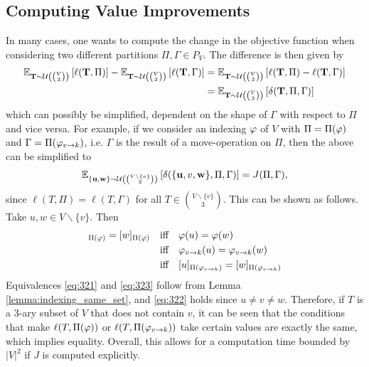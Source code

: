 \subsection{Computing Value Improvements}
In many cases, one wants to compute the change in the objective function when considering two different partitions $\Pi,\Gamma \in P_V$. The difference is then given by
\begin{align*}
    \mathbb{E}_{{\bf T} \sim \mathcal{U}\left(\binom{V}{3}\right)} \left[\ell({\bf T}, \Pi)\right] - \mathbb{E}_{{\bf T} \sim \mathcal{U}\left(\binom{V}{3}\right)} \left[\ell({\bf T}, \Gamma)\right] &= \mathbb{E}_{{\bf T} \sim \mathcal{U}\left(\binom{V}{3}\right)} \left[\ell({\bf T}, \Pi) - \ell({\bf T}, \Gamma)\right] \\
    &= \mathbb{E}_{{\bf T} \sim \mathcal{U}\left(\binom{V}{3}\right)} \left[\delta({\bf T}, \Pi, \Gamma)\right]
\end{align*}
which can possibly be simplified, dependent on the shape of $\Gamma$ with respect to $\Pi$ and vice versa. For example, if we consider an indexing $\varphi$ of $V$ with $\Pi = \Pi(\varphi)$ and $\Gamma = \Pi(\varphi_{v\rightarrow k})$, i.e. $\Gamma$ is the result of a move-operation on $\Pi$, then the above can be simplified to
\begin{align*}
    \mathbb{E}_{{\bf \{u,w\}} \sim \mathcal{U}\left(\binom{V\backslash\{v\}}{2}\right)} \left[\delta(\{{\bf u},v,{\bf w} \}, \Pi, \Gamma)\right] = J(\Pi, \Gamma),
\end{align*}
since $\ell(T,\Pi) = \ell(T,\Gamma)$ for all $T \in \binom{V \backslash \{ v\} }{3}$. This can be shown as follows. Take $u,w \in V\backslash\{v\}$. Then 
\begin{align}
    [u]_{\Pi(\idx)} = [w]_{\Pi(\idx)} &\iff \idx(u) = \idx(w)  \label{eq:321} \\
    &\iff \move{\idx}{v}{k}(u) = \move{\idx}{v}{k}(w)  \label{eq:322} \\
    &\iff [u]_{\Pi(\move{\idx}{v}{k})} = [w]_{\Pi(\move{\idx}{v}{k})}  \label{eq:323}
\end{align}
Equivalences \eqref{eq:321} and \eqref{eq:323} follow from Lemma \ref{lemma:indexing_same_set}, and \eqref{eq:322} holds since $u \neq v \neq w$. Therefore, if $T$ is a 3-ary subset of $V$ that does not contain $v$, it can be seen that the conditions that make $\ell(T,\Pi(\varphi))$ or $\ell(T,\Pi(\varphi_{v\rightarrow k}))$ take certain values are exactly the same, which implies equality. Overall, this allows for a computation time bounded by $|V|^2$ if $J$ is computed explicitly. 
